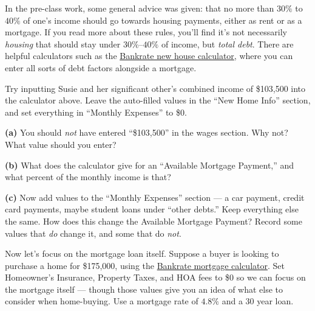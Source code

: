 \documentclass[12pt]{ximera}
\begin{document}
In the pre-class work, some general advice was given: that no more than $30\%$ to
$40\%$ of one's income should go towards housing payments, either as rent or as a
mortgage. If you read more about these rules, you'll find it's not necessarily
\emph{housing} that should stay under $30\%$--$40\%$ of income, but \emph{total debt}.
There are helpful calculators such as the
\href{https://www.bankrate.com/calculators/mortgages/new-house-calculator.aspx}{Bankrate
new house calculator}, where you can enter all sorts of debt factors alongside a
mortgage.

\begin{problem}
Try inputting Susie and her significant other's combined income of \$103,500 into the
calculator above. Leave the auto-filled values in the ``New Home Info'' section, and
set everything in ``Monthly Expenses'' to \$0.

\begin{prompt}
\textbf{(a)} You should \emph{not} have entered ``\$103,500'' in the wages section.
Why not? What value should you enter?
\begin{freeResponse}
\end{freeResponse}
\end{prompt}

\begin{prompt}
\textbf{(b)} What does the calculator give for an ``Available Mortgage Payment,'' and
what percent of the monthly income is that?
\begin{freeResponse}
\end{freeResponse}
\end{prompt}

\begin{prompt}
\textbf{(c)} Now add values to the ``Monthly Expenses'' section --- a car payment,
credit card payments, maybe student loans under ``other debts.'' Keep everything else
the same. How does this change the Available Mortgage Payment? Record some values
that \emph{do} change it, and some that do \emph{not}.
\begin{freeResponse}
\end{freeResponse}
\end{prompt}
\end{problem}

Now let's focus on the mortgage loan itself. Suppose a buyer is looking to purchase a
home for \$175,000, using the
\href{https://www.bankrate.com/calculators/mortgages/mortgage-calculator-beta/}{Bankrate
mortgage calculator}. Set Homeowner's Insurance, Property Taxes, and HOA fees to \$0
so we can focus on the mortgage itself --- though those values give you an idea of
what else to consider when home-buying. Use a mortgage rate of $4.8\%$ and a 30 year
loan.
\end{document}
